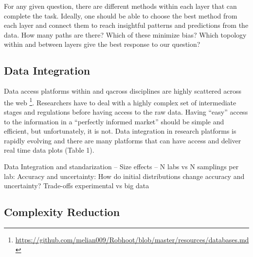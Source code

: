 \documentclass[english,12pt]{article}
\begin{document}
For any given question, there are different
methods within each layer that can complete the task. Ideally, one
should be able to choose the best method from each layer and connect
them to reach insightful patterns and predictions from the data. How
many paths are there? Which of these minimize bias? Which topology
within and between layers give the best response to our question?

\subsection{Data Integration}

Data access platforms within and qacross disciplines are highly
scattered across the web
\footnote{\url{https://github.com/melian009/Robhoot/blob/master/resources/databases.md}}. Researchers
have to deal with a highly complex set of intermediate stages and
regulations before having access to the raw data. Having ``easy''
access to the information in a ``perfectly informed market'' should be
simple and efficient, but unfortunately, it is not. Data integration
in research platforms is rapidly evolving and there are many platforms
that can have access and deliver real time data plots (Table 1).

Data Integration and standarization -- Size effects -- N labs vs N
samplings per lab: Accuracy and uncertainty: How do initial
distributions change accuracy and uncertainty? Trade-offs experimental
vs big data

\subsection{Complexity Reduction}
\end{document}
